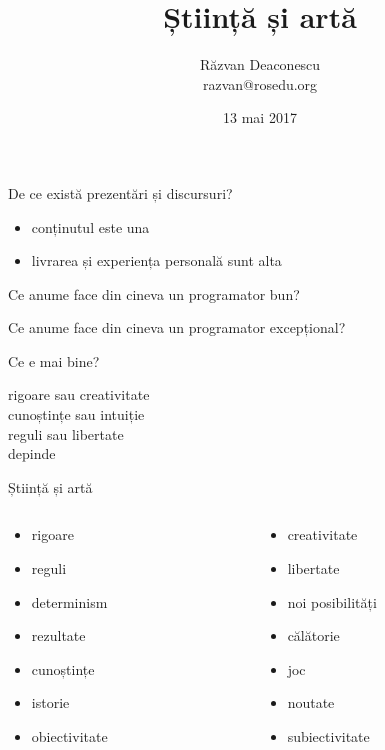 \documentclass{beamer}
\title[Știință și artă]{Știință și artă}
\institute{CDL, ROSEdu}
\author[Răzvan Deaconescu]{Răzvan Deaconescu \\
razvan@rosedu.org}
\date{13 mai 2017}
\begin{document}
\frame{\titlepage}

\begin{frame}{De ce există prezentări și discursuri?}
  \begin{itemize}
    \item conținutul este una
    \item livrarea și experiența personală sunt alta
  \end{itemize}
\end{frame}

\begin{frame}{Ce anume face din cineva un programator bun?}
\end{frame}

\begin{frame}{Ce anume face din cineva un programator excepțional?}
\end{frame}

\begin{frame}{Ce e mai bine?}
  \begin{center}
    \pause
    rigoare sau creativitate \\
    \vspace{0.5cm}
    \pause
    cunoștințe sau intuiție \\
    \vspace{0.5cm}
    \pause
    reguli sau libertate\\
    \vspace{1cm}
    \pause
    \Large{depinde}
  \end{center}
\end{frame}

\begin{frame}{Știință și artă}
  \begin{columns}
    \begin{column}{0.5\textwidth}
      \begin{itemize}
        \item rigoare
        \item reguli
        \item determinism
        \item rezultate
        \item cunoștințe
        \item istorie
        \item obiectivitate
      \end{itemize}
    \end{column}
    \begin{column}{0.5\textwidth}
      \begin{itemize}
        \item creativitate
        \item libertate
        \item noi posibilități
        \item călătorie
        \item joc
        \item noutate
        \item subiectivitate
      \end{itemize}
    \end{column}
  \end{columns}
\end{frame}
\end{document}
